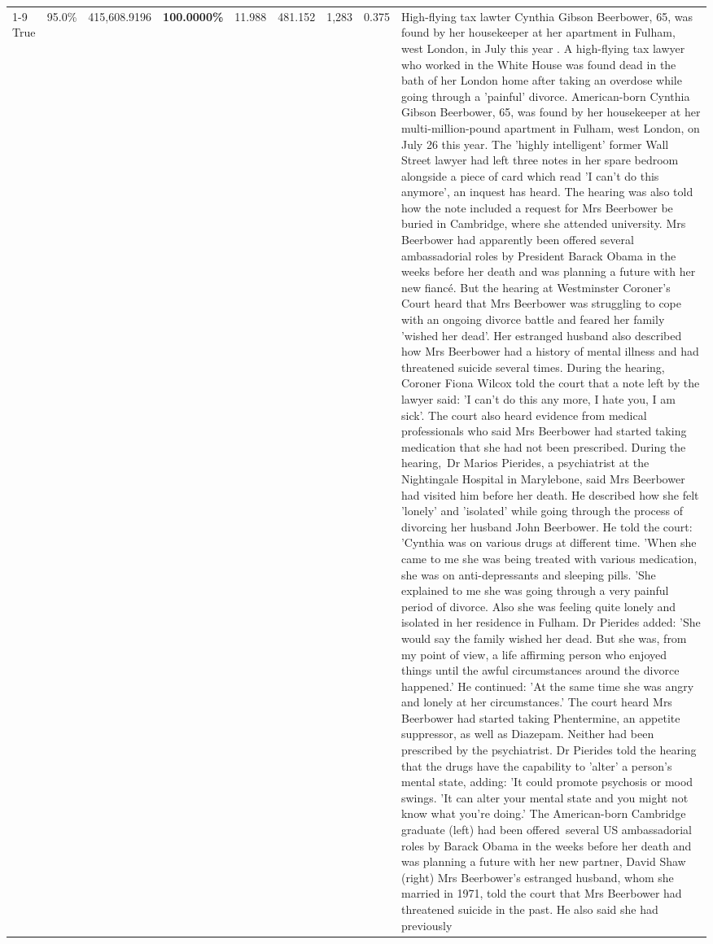 \begin{table}[H]
\begin{tabular}{lllrlllll}
\cline{1-9}
True & 95.0\% & 415,608.9196 & \bfseries \color{red} 100.0000\% & 11.988 & 481.152 & 1,283 & 0.375 & High-flying tax lawter Cynthia Gibson Beerbower, 65, was found by her housekeeper at her apartment in Fulham, west London, in July this year . A high-flying tax lawyer who worked in the White House was found dead in the bath of her London home after taking an overdose while going through a 'painful' divorce. American-born Cynthia Gibson Beerbower, 65, was found by her housekeeper at her multi-million-pound apartment in Fulham, west London, on July 26 this year. The 'highly intelligent' former Wall Street lawyer had left three notes in her spare bedroom alongside a piece of card which read 'I can't do this anymore', an inquest has heard. The hearing was also told how the note included a request for Mrs Beerbower be buried in Cambridge, where she attended university. Mrs Beerbower had apparently been offered several ambassadorial roles by President Barack Obama in the weeks before her death and was planning a future with her new fiancé. But the hearing at Westminster Coroner's Court heard that Mrs Beerbower was struggling to cope with an ongoing divorce battle and feared her family 'wished her dead'. Her estranged husband also described how Mrs Beerbower had a history of mental illness and had threatened suicide several times. During the hearing, Coroner Fiona Wilcox told the court that a note left by the lawyer said: 'I can't do this any more, I hate you, I am sick'. The court also heard evidence from medical professionals who said Mrs Beerbower had started taking medication that she had not been prescribed. During the hearing, Dr Marios Pierides, a psychiatrist at the Nightingale Hospital in Marylebone, said Mrs Beerbower had visited him before her death. He described how she felt 'lonely' and 'isolated' while going through the process of divorcing her husband John Beerbower. He told the court: 'Cynthia was on various drugs at different time. 'When she came to me she was being treated with various medication, she was on anti-depressants and sleeping pills. 'She explained to me she was going through a very painful period of divorce. Also she was feeling quite lonely and isolated in her residence in Fulham. Dr Pierides added: 'She would say the family wished her dead. But she was, from my point of view, a life affirming person who enjoyed things until the awful circumstances around the divorce happened.' He continued: 'At the same time she was angry and lonely at her circumstances.' The court heard Mrs Beerbower had started taking Phentermine, an appetite suppressor, as well as Diazepam. Neither had been prescribed by the psychiatrist. Dr Pierides told the hearing that the drugs have the capability to 'alter' a person's mental state, adding: 'It could promote psychosis or mood swings. 'It can alter your mental state and you might not know what you're doing.' The American-born Cambridge graduate (left) had been offered several US ambassadorial roles by Barack Obama in the weeks before her death and was planning a future with her new partner, David Shaw (right) Mrs Beerbower's estranged husband, whom she married in 1971, told the court that Mrs Beerbower had threatened suicide in the past. He also said she had previously 
\end{tabular}
\end{table}
